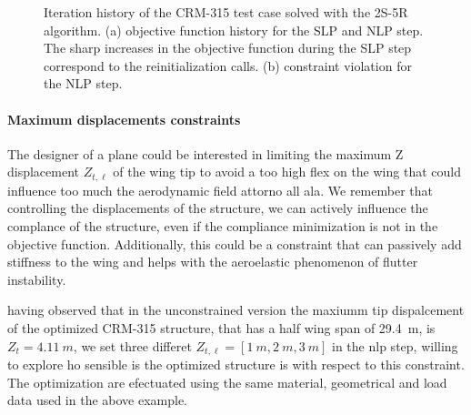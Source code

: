     \begin{figure}
        \centering
        \bigskip
        \caption{Iteration history of the CRM-315 test case solved with the 2S-5R algorithm. (a) objective function history for the SLP and NLP step. The sharp increases in the objective function during the SLP step correspond to the reinitialization calls. (b) constraint violation for the NLP step.}
        \label{fig:07_c2}
    \end{figure}

\paragraph{Maximum displacements constraints}
The designer of a plane could be interested in limiting the maximum Z displacement $Z_{t,\ell}$ of the wing tip to avoid a too high flex on the wing that could influence too much the aerodynamic field attorno all ala. We remember that controlling the displacements of the structure, we can actively influence the complance of the structure, even if the compliance minimization is not in the objective function. Additionally, this could be a constraint that can passively add stiffness to the wing and helps with the aeroelastic phenomenon of flutter instability.

having observed that in the unconstrained version the maxiumm tip dispalcement of the optimized CRM-315 structure, that has a half wing span of \qty{29.4}{m}, is $Z_t=\qty{4.11}{m}$, we set three differet $Z_{t,\ell} = [\qty{1}{m},\qty{2}{m},\qty{3}{m}]$ in the \gls{nlp} step, willing to explore ho sensible is the optimized structure is with respect to this constraint. The optimization are efectuated using the same material, geometrical and load data used in the above example.

